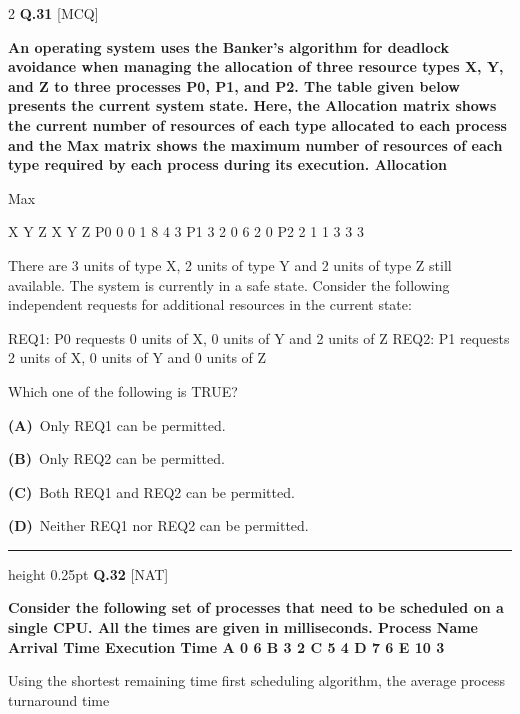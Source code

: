 \documentclass[a4paper,10pt,twoside]{article}
\begin{document}
\begin{multicols}{2}
\noindent\textbf{Q.31} \hfill {\footnotesize\textsf{[MCQ]}}
\par\vspace{2pt}
{\bfseries An operating system uses the Banker's algorithm for deadlock avoidance when managing the
allocation of three resource types X, Y, and Z to three processes P0, P1, and P2. The table given
below presents the current system state. Here, the Allocation matrix shows the current number of
resources of each type allocated to each process and the Max matrix shows the maximum number
of resources of each type required by each process during its execution.
Allocation
\par\smallskip
Max
\par\smallskip
X Y Z
X Y Z
P0
0 0 1
8 4 3
P1
3 2 0
6 2 0
P2
2 1 1
3 3 3
\par\smallskip
There are 3 units of type X, 2 units of type Y and 2 units of type Z still available. The system is
currently in a safe state. Consider the following independent requests for additional resources in the
current state:
\par\smallskip
REQ1: P0 requests 0 units of X, 0 units of Y and 2 units of Z
REQ2: P1 requests 2 units of X, 0 units of Y and 0 units of Z
\par\smallskip
Which one of the following is TRUE? \par}
\par\vspace{2pt}\noindent
\textbf{(A)}~Only REQ1 can be permitted.\par\vspace{2pt}\noindent
\textbf{(B)}~Only REQ2 can be permitted.\par\vspace{2pt}\noindent
\textbf{(C)}~Both REQ1 and REQ2 can be permitted.\par\vspace{2pt}\noindent
\textbf{(D)}~Neither REQ1 nor REQ2 can be permitted.
\par\vspace{6pt}\hrule height 0.25pt\vspace{6pt}
\noindent\textbf{Q.32} \hfill {\footnotesize\textsf{[NAT]}}
\par\vspace{2pt}
{\bfseries Consider the following set of processes that need to be scheduled on a single CPU. All the times are
given in milliseconds.
Process Name
Arrival Time
Execution Time
A
0
6
B
3
2
C
5
4
D
7
6
E
10
3
\par\smallskip
Using the shortest remaining time first scheduling algorithm, the average process turnaround time
}
\end{multicols}
\end{document}
